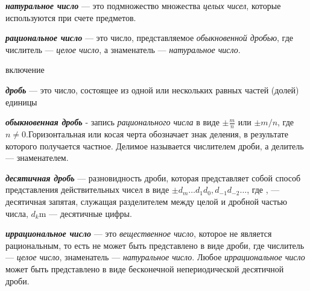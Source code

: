 \textbf{\textit{натуральное число}} --- это подмножество множества \textit{целых чисел}, которые используются при счете предметов.


\begin{SCn}
\end{SCn}

\textbf{\textit{рациональное число}} --- это число, представляемое \textit{обыкновенной дробью}, где числитель — \textit{целое число}, а знаменатель — \textit{натуральное число}.

\begin{SCn}
\begin{scnrelfromlist}{включение}
\end{scnrelfromlist}
\end{SCn}

\textbf{\textit{дробь}} — это число, состоящее из одной или нескольких равных частей (долей) единицы

\begin{SCn}
\end{SCn}

\textbf{\textit{обыкновенная дробь}} - запись \textit{рационального числа} в виде ${\displaystyle \pm {\frac {m}{n}}}$ или ${\pm m/n}$, где ${n\neq 0}$.Горизонтальная или косая черта обозначает знак деления, в результате которого получается частное. Делимое называется числителем дроби, а делитель — знаменателем.

\begin{SCn}
\end{SCn}

\textbf{\textit{десятичная дробь}} — разновидность дроби, которая представляет собой способ представления действительных чисел в виде ${\pm d_m \ldots d_1 d_0{,} d_{-1} d_{-2} \ldots}$, где , — десятичная запятая, служащая разделителем между целой и дробной частью числа, ${d_{k}}$m — десятичные цифры.

\begin{SCn}
\end{SCn}

\textbf{\textit{иррациональное число}} --- это \textit{вещественное число}, которое не является рациональным, то есть не может быть представлено в виде дроби, где числитель — \textit{целое число}, знаменатель — \textit{натуральное число}. Любое \textit{иррациональное число} может быть представлено в виде бесконечной непериодической десятичной дроби.

